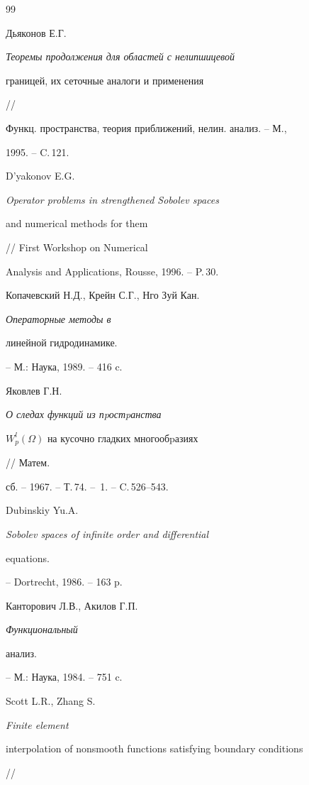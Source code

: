 \begin{thebibliography}{99}


Дьяконов Е.Г. {\em Теоремы продолжения для областей с нели\-пшицевой


границей, их сеточные аналоги и применения} //


Функц. пространства, теория приближений, нелин. анализ. -- М.,


1995. -- C.\,121.







D'yakonov E.G. {\em Operator problems in strengthened Sobolev spaces


and numerical methods for them} // First Workshop on Numerical


Analysis and Applications, Rousse, 1996. -- P.\,30.







Копачевский Н.Д., Крейн С.Г., Нго Зуй Кан. {\em Операторные методы в


линейной гидродинамике.} -- М.: Наука, 1989. -- 416 c.







Яковлев Г.Н. {\em О следах функций из пpостpанства


$W_p^l(\Omega)$ на кусочно гладких многообpазиях} // Матем.


сб. -- 1967. -- Т.\,74. -- \No\,1. -- C.\,526--543.







Dubinskiy Yu.A. {\em Sobolev spaces of infinite order and differential


equations.} -- Dortrecht, 1986. -- 163 p.







Канторович Л.В., Акилов Г.П. {\em Функциональный


анализ.} -- М.: Наука, 1984. -- 751 c.







Scott L.R., Zhang S. {\em Finite element


interpolation of nonsmooth functions satisfying boundary conditions} //



\end{thebibliography}
